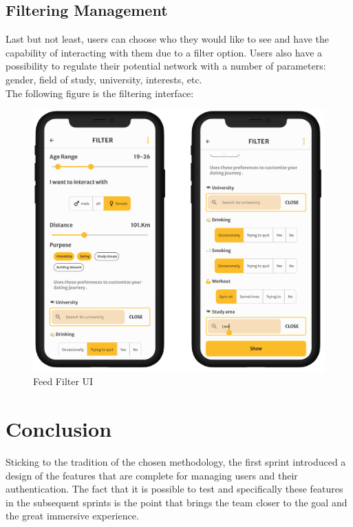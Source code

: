 \subsection{Filtering Management}
Last but not least, users can choose who they would like to see and have the capability of interacting with them due to a filter option. Users also have a possibility to regulate their potential network with a number of parameters: gender, field of study, university, interests, etc.\\
The following figure is the filtering interface:
\begin{figure}[H] 
            \centering
            \includegraphics[scale=0.2]{filter ui.png}
            \caption{Feed Filter UI} 
            \label{fig: Feed Filter UI}
\end{figure}

\section*{Conclusion}
Sticking to the tradition of the chosen methodology, the first sprint introduced a design of the features that are complete for managing users and their authentication. The fact that it is possible to test and specifically these features in the subsequent sprints is the point that brings the team closer to the goal and the great immersive experience. 

